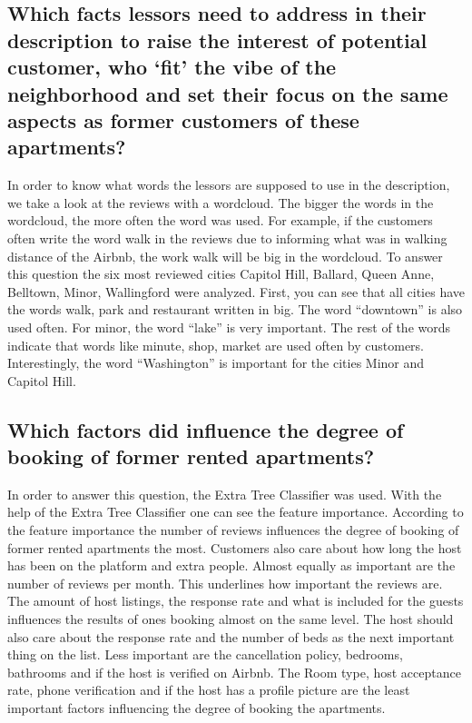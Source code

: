 \documentclass[journal]{IEEEtran}
\begin{document}
\subsection{Which facts lessors need to address in their description to raise the interest of potential customer, who ‘fit’ the vibe of the neighborhood and set their focus on the same aspects as former customers of these apartments?}
In order to know what words the lessors are supposed to use in the description, we take a look at the reviews with a wordcloud. The bigger the words in the wordcloud, the more often the word was used. For example, if the customers often write the word walk in the reviews due to informing what was in walking distance of the Airbnb, the work walk will be big in the wordcloud. 
To answer this question the six most reviewed cities Capitol Hill, Ballard, Queen Anne, Belltown, Minor, Wallingford were analyzed. First, you can see that all cities have the words walk, park and restaurant written in big. The word “downtown” is also used often. For minor, the word “lake” is very important. The rest of the words indicate that words like minute, shop, market are used often by customers. Interestingly, the word “Washington” is important for the cities Minor and Capitol Hill.


\subsection{Which factors did influence the degree of booking of former rented apartments? }
In order to answer this question, the Extra Tree Classifier was used. With the help of the Extra Tree Classifier one can see the feature importance. According to the feature importance the number of reviews influences the degree of booking of former rented apartments the most. Customers also care about how long the host has been on the platform and extra people. Almost equally as important are the number of reviews per month. This underlines how important the reviews are. The amount of host listings, the response rate and what is included for the guests influences the results of ones booking almost on the same level. The host should also care about the response rate and the number of beds as the next important thing on the list. Less important are the cancellation policy, bedrooms, bathrooms and if the host is verified on Airbnb. The Room type, host acceptance rate, phone verification and if the host has a profile picture are the least important factors influencing the degree of booking the apartments.
\end{document}
